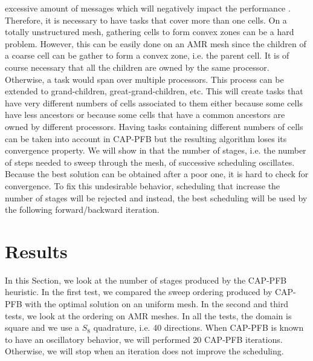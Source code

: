 \documentclass[letterpaper]{article}
\renewcommand{\(}{\left(}
\renewcommand{\)}{\right)}
\renewcommand{\[}{\left[}
\renewcommand{\]}{\right]}
\begin{document}
excessive amount of messages which will negatively impact the performance
\cite{Pautz2002}. Therefore, it is necessary to have tasks that cover more than
one cells. On a totally unstructured mesh, gathering cells to form convex zones
can be a hard problem. However, this can be easily done on an AMR mesh since the
children of a coarse cell can be gather to form a convex zone, i.e. the parent
cell. It is of course necessary that all the children are owned by the same
processor. Otherwise, a task would span over multiple processors. This process
can be extended to grand-children, great-grand-children, etc. This will create
tasks that have very different numbers of cells associated to them either
because some cells have less ancestors or because some cells that have a common
ancestors are owned by different processors. Having tasks containing different
numbers of cells can be  taken into account in CAP-PFB but the resulting
algorithm loses its convergence property. We will show in  that
the number of stages, i.e. the number of steps needed to sweep through the mesh, of successive scheduling oscillates. Because the best
solution can be obtained after a poor one, it is hard to check for convergence.
To fix this undesirable behavior, scheduling that increase the number of stages
will be rejected and instead, the best scheduling will be used by the following
forward/backward iteration.


\section{Results} \label{results}
In this Section, we look at the number of stages produced by the CAP-PFB
heuristic. In the first test, we compared the sweep ordering produced by CAP-PFB
with the optimal solution on an uniform mesh. In the second and third tests, we
look at the ordering on AMR meshes. In all the tests, the domain is square and
we use a $S_8$ quadrature, i.e. 40 directions. When CAP-PFB is known to have an
oscillatory behavior, we will performed 20 CAP-PFB iterations. Otherwise, we
will stop when an iteration does not improve the scheduling.
\end{document}
